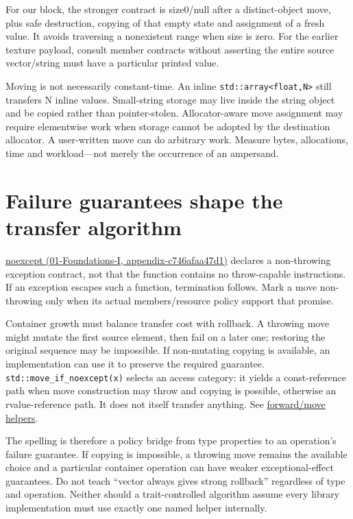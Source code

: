 For our block, the stronger contract is size0/null after a distinct-object move, plus safe destruction, copying of that empty state and assignment of a fresh value. It avoids traversing a nonexistent range when size is zero. For the earlier texture payload, consult member contracts without asserting the entire source vector/string must have a particular printed value.

Moving is not necessarily constant-time. An inline \texttt{std::array\textless{}float,N\textgreater{}} still transfers N inline values. Small-string storage may live inside the string object and be copied rather than pointer-stolen. Allocator-aware move assignment may require elementwise work when storage cannot be adopted by the destination allocator. A user-written move can do arbitrary work. Measure bytes, allocations, time and workload---not merely the occurrence of an ampersand.

\section{Failure guarantees shape the transfer algorithm}\label{05-engine-i-ch003-failure-guarantees-shape-the-transfer-algorithm}

\href{../01-Foundations-I/main.pdf\#nameddest=appendix-c746afaa47d1}{noexcept (01-Foundations-I, appendix-c746afaa47d1)} declares a non-throwing exception contract, not that the function contains no throw-capable instructions. If an exception escapes such a function, termination follows. Mark a move non-throwing only when its actual members/resource policy support that promise.

Container growth must balance transfer cost with rollback. A throwing move might mutate the first source element, then fail on a later one; restoring the original sequence may be impossible. If non-mutating copying is available, an implementation can use it to preserve the required guarantee. \texttt{std::move\_if\_noexcept(x)} selects an access category: it yields a const-reference path when move construction may throw and copying is possible, otherwise an rvalue-reference path. It does not itself transfer anything. See \href{https://eel.is/c++draft/forward}{forward/move helpers}.

The spelling is therefore a policy bridge from type properties to an operation's failure guarantee. If copying is impossible, a throwing move remains the available choice and a particular container operation can have weaker exceptional-effect guarantees. Do not teach ``vector always gives strong rollback'' regardless of type and operation. Neither should a trait-controlled algorithm assume every library implementation must use exactly one named helper internally.

